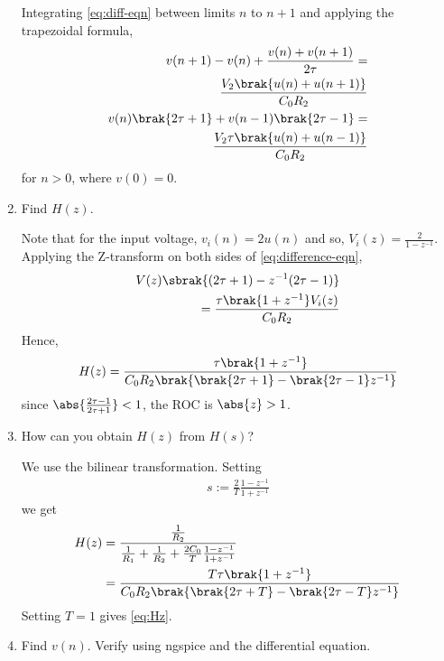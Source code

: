 \documentclass[journal,12pt,twocolumn]{IEEEtran}
\renewcommand\thesection{\arabic{section}}
\begin{document}
\begin{enumerate}[label=\arabic*.,ref=\thesection.\theenumi]
\solution Integrating \eqref{eq:diff-eqn} between limits $n$ to $n+1$ 
and applying the trapezoidal formula,
\begin{align}
    v(n+1) - v(n) + \frac{v(n) + v(n+1)}{2\tau} = \nonumber\\
    \frac{V_2\brak{u(n)+u(n+1)}}{C_0R_2} \\
    v(n)\brak{2\tau+1} + v(n-1)\brak{2\tau-1} = \nonumber\\ 
    \frac{V_2\tau\brak{u(n)+u(n-1)}}{C_0R_2}
    \label{eq:difference-eqn}
\end{align}
for $n > 0$, where $v(0) = 0$.
\item Find $H(z)$.

\solution Note that for the input voltage, $v_i(n) = 2u(n)$ and
so, $V_i(z) = \frac{2}{1-z^{-1}}$. Applying the Z-transform
on both sides of \eqref{eq:difference-eqn},
\begin{align}
    V(z)\sbrak{(2\tau + 1) - z^{-1}(2\tau - 1)} \nonumber \\
    = \frac{\tau\brak{1 + z^{-1}}V_i(z)}{C_0R_2}
\end{align}
Hence,
\begin{align}
    H(z) = \frac{\tau\brak{1+z^{-1}}}{C_0R_2\brak{\brak{2\tau+1}-\brak{2\tau-1}z^{-1}}}
    \label{eq:Hz}
\end{align}
since $\abs{\frac{2\tau-1}{2\tau+1}} < 1$, the ROC is $\abs{z} > 1$.
\item How can you obtain $H(z)$ from $H(s)$?

\solution We use the bilinear transformation. Setting
\begin{align}
    s := \frac{2}{T}\frac{1 - z^{-1}}{1 + z^{-1}}
\end{align}
we get
\begin{align}
    H(z) &= \frac{\frac{1}{R_2}}{\frac{1}{R_1} + \frac{1}{R_2} + \frac{2C_0}{T}\frac{1 - z^{-1}}{1 + z^{-1}}} \\
         &= \frac{T\tau\brak{1+z^{-1}}}{C_0R_2\brak{\brak{2\tau+T}-\brak{2\tau-T}z^{-1}}}
\end{align}
Setting $T = 1$ gives \eqref{eq:Hz}.

\item Find $v(n)$. Verify using ngspice and the differential equation.


\end{enumerate}
\end{document}
